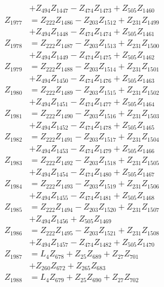\begin{multicols}{2}
\begin{align}
&+ Z_{494}Z_{1447} - Z_{474}Z_{1473} + Z_{505}Z_{1460} \nonumber \\
Z_{1977} &= Z_{222}Z_{1486} - Z_{203}Z_{1512} + Z_{231}Z_{1499}  \nonumber \\
&+ Z_{494}Z_{1448} - Z_{474}Z_{1474} + Z_{505}Z_{1461} \nonumber \\
Z_{1978} &= Z_{222}Z_{1487} - Z_{203}Z_{1513} + Z_{231}Z_{1500}  \nonumber \\
&+ Z_{494}Z_{1449} - Z_{474}Z_{1475} + Z_{505}Z_{1462} \nonumber \\
Z_{1979} &= Z_{222}Z_{1488} - Z_{203}Z_{1514} + Z_{231}Z_{1501}  \nonumber \\
&+ Z_{494}Z_{1450} - Z_{474}Z_{1476} + Z_{505}Z_{1463} \nonumber \\
Z_{1980} &= Z_{222}Z_{1489} - Z_{203}Z_{1515} + Z_{231}Z_{1502}  \nonumber \\
&+ Z_{494}Z_{1451} - Z_{474}Z_{1477} + Z_{505}Z_{1464} \nonumber \\
Z_{1981} &= Z_{222}Z_{1490} - Z_{203}Z_{1516} + Z_{231}Z_{1503}  \nonumber \\
&+ Z_{494}Z_{1452} - Z_{474}Z_{1478} + Z_{505}Z_{1465} \nonumber \\
Z_{1982} &= Z_{222}Z_{1491} - Z_{203}Z_{1517} + Z_{231}Z_{1504}  \nonumber \\
&+ Z_{494}Z_{1453} - Z_{474}Z_{1479} + Z_{505}Z_{1466} \nonumber \\
Z_{1983} &= Z_{222}Z_{1492} - Z_{203}Z_{1518} + Z_{231}Z_{1505}  \nonumber \\
&+ Z_{494}Z_{1454} - Z_{474}Z_{1480} + Z_{505}Z_{1467} \nonumber \\
Z_{1984} &= Z_{222}Z_{1493} - Z_{203}Z_{1519} + Z_{231}Z_{1506}  \nonumber \\
&+ Z_{494}Z_{1455} - Z_{474}Z_{1481} + Z_{505}Z_{1468} \nonumber \\
Z_{1985} &= Z_{222}Z_{1494} - Z_{203}Z_{1520} + Z_{231}Z_{1507}  \nonumber \\
&+ Z_{494}Z_{1456} + Z_{505}Z_{1469} \nonumber \\
Z_{1986} &= Z_{222}Z_{1495} - Z_{203}Z_{1521} + Z_{231}Z_{1508}  \nonumber \\
&+ Z_{494}Z_{1457} - Z_{474}Z_{1482} + Z_{505}Z_{1470} \nonumber \\
Z_{1987} &= L_4Z_{678} + Z_{25}Z_{689} + Z_{27}Z_{701}  \nonumber \\
&+ Z_{260}Z_{672} + Z_{265}Z_{683} \nonumber \\
Z_{1988} &= L_4Z_{679} + Z_{25}Z_{690} + Z_{27}Z_{702}  \nonumber \\

\end{align}
\end{multicols}
